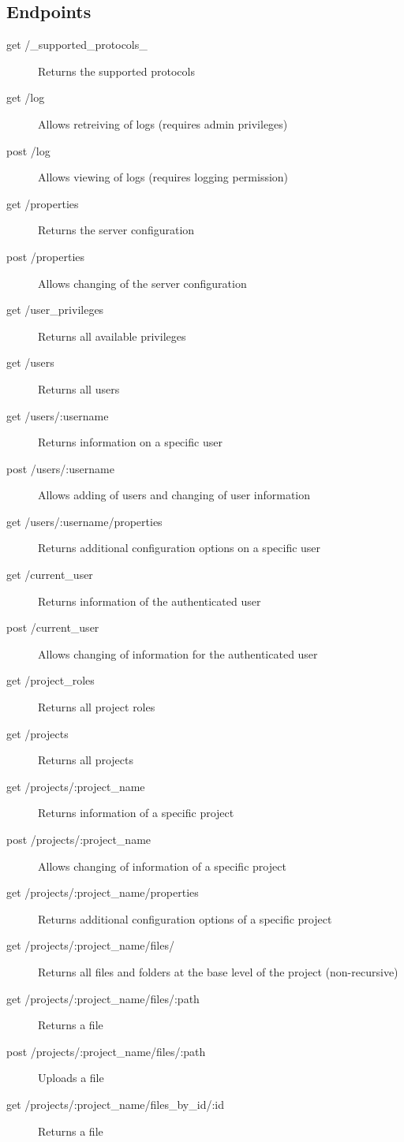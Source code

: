 \subsection{Endpoints}
\begin{description}
\item[get  /\_supported\_protocols\_] Returns the supported protocols
\item[get  /log] Allows retreiving of logs (requires admin privileges)
\item[post /log] Allows viewing of logs (requires logging permission)
\item[get  /properties] Returns the server configuration
\item[post /properties] Allows changing of the server configuration
\item[get  /user\_privileges] Returns all available privileges
\item[get  /users] Returns all users 
\item[get  /users/:username] Returns information on a specific user
\item[post /users/:username] Allows adding of users and changing of user information
\item[get  /users/:username/properties] Returns additional configuration options on a specific user
\item[get  /current\_user] Returns information of the authenticated user
\item[post /current\_user] Allows changing of information for the authenticated user
\item[get  /project\_roles] Returns all project roles
\item[get  /projects] Returns all projects
\item[get  /projects/:project\_name] Returns information of a specific project
\item[post /projects/:project\_name] Allows changing of information of a specific project
\item[get  /projects/:project\_name/properties] Returns additional configuration options of a specific project
\item[get  /projects/:project\_name/files/] Returns all files and folders at the base level of the project (non-recursive)
\item[get  /projects/:project\_name/files/:path] Returns a file
\item[post /projects/:project\_name/files/:path] Uploads a file
\item[get  /projects/:project\_name/files\_by\_id/:id] Returns a file
\end{description}